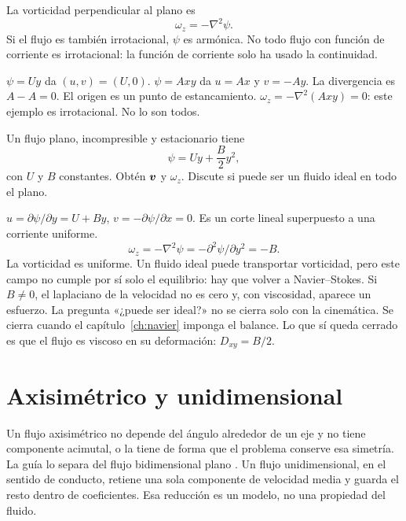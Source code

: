 La vorticidad perpendicular al plano es
\begin{equation}
\label{eq:omega-psi}
\omega_z=-\nabla^2\psi.
\end{equation}
Si el flujo es también irrotacional, \(\psi\) es armónica. No todo flujo con función de corriente es irrotacional: la función de corriente solo ha usado la continuidad.

\begin{examplebox}
\(\psi=Uy\) da \((u,v)=(U,0)\). \(\psi=Axy\) da \(u=Ax\) y \(v=-Ay\). La divergencia es \(A-A=0\). El origen es un punto de estancamiento. \(\omega_z=-\nabla^2(Axy)=0\): este ejemplo es irrotacional. No lo son todos.
\end{examplebox}

\begin{problembox}
Un flujo plano, incompresible y estacionario tiene
\[
\psi=U y+\frac{B}{2}y^2,
\]
con \(U\) y \(B\) constantes. Obtén \(\boldsymbol{v}\) y \(\omega_z\). Discute si puede ser un fluido ideal en todo el plano.
\end{problembox}
\begin{solutionbox}
\(u=\partial\psi/\partial y=U+By\), \(v=-\partial\psi/\partial x=0\). Es un corte lineal superpuesto a una corriente uniforme.
\[
\omega_z=-\nabla^2\psi=-\partial^2\psi/\partial y^2=-B.
\]
La vorticidad es uniforme. Un fluido ideal puede transportar vorticidad, pero este campo no cumple por sí solo el equilibrio: hay que volver a Navier--Stokes. Si \(B\neq 0\), el laplaciano de la velocidad no es cero y, con viscosidad, aparece un esfuerzo. La pregunta «¿puede ser ideal?» no se cierra solo con la cinemática. Se cierra cuando el capítulo~\ref{ch:navier} imponga el balance. Lo que sí queda cerrado es que el flujo es viscoso en su deformación: \(D_{xy}=B/2\).
\end{solutionbox}

\section{Axisimétrico y unidimensional}

Un flujo axisimétrico no depende del ángulo alrededor de un eje y no tiene componente acimutal, o la tiene de forma que el problema conserve esa simetría. La guía lo separa del flujo bidimensional plano \parencite{uleGuia2026}. Un flujo unidimensional, en el sentido de conducto, retiene una sola componente de velocidad media y guarda el resto dentro de coeficientes. Esa reducción es un modelo, no una propiedad del fluido.

